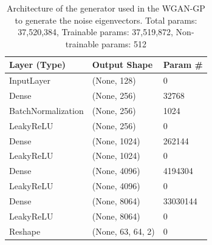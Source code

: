 \documentclass{article}
\begin{document}
\begin{table}[]
    \begin{tabular}{|l|l|l|}
        \hline
        \textbf{Layer (Type)} & \textbf{Output Shape} & \textbf{Param \#} \\ \hline
        InputLayer            & (None, 128)           & 0                 \\ \hline
        Dense                 & (None, 256)           & 32768             \\ \hline
        BatchNormalization    & (None, 256)           & 1024              \\ \hline
        LeakyReLU             & (None, 256)           & 0                 \\ \hline
        Dense                 & (None, 1024)          & 262144            \\ \hline
        LeakyReLU             & (None, 1024)          & 0                 \\ \hline
        Dense                 & (None, 4096)          & 4194304           \\ \hline
        LeakyReLU             & (None, 4096)          & 0                 \\ \hline
        Dense                 & (None, 8064)          & 33030144          \\ \hline
        LeakyReLU             & (None, 8064)          & 0                 \\ \hline
        Reshape               & (None, 63, 64, 2)     & 0                 \\ \hline
    \end{tabular}
    \caption{Architecture of the generator used in the WGAN-GP to generate the noise eigenvectors. Total params: 37,520,384, Trainable params: 37,519,872, Non-trainable params: 512}
    \label{tab:noise_evecs_generator_WGANGP_architecture}
\end{table}
\end{document}
